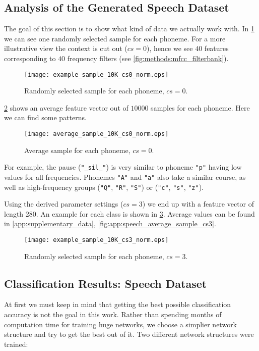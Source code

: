 \subsection*{Analysis of the Generated Speech Dataset}
The goal of this section is to show what kind of data we actually work with. In \cref{fig:examples:speech_example_sample_cs0} we can see one randomly selected sample for each phoneme. For a more illustrative view the context is cut out ($ cs = 0 $), hence we see $ 40 $ features corresponding to $ 40 $ frequency filters (see \cref{fig:methods:mfcc_filterbank}).

\begin{figure}[H]
\centering
\texttt{[image: example\_sample\_10K\_cs0\_norm.eps]}
\caption{Randomly selected sample for each phoneme, $ cs = 0 $.}
\label{fig:examples:speech_example_sample_cs0}
\end{figure}

\cref{fig:examples:speech_average_sample_cs0} shows an average feature vector out of $ 10000 $ samples for each phoneme. Here we can find some patterns.

\begin{figure}[H]
\centering
\texttt{[image: average\_sample\_10K\_cs0\_norm.eps]}
\caption{Average sample for each phoneme, $ cs = 0 $.}
\label{fig:examples:speech_average_sample_cs0}
\end{figure}

For example, the pause (\texttt{"\_sil\_"}) is very similar to phoneme \texttt{"p"} having low values for all frequencies. Phonemes \texttt{"A"} and \texttt{"a"} also take a similar course, as well as high-frequency groups (\texttt{"Q"}, \texttt{"R"}, \texttt{"S"}) or (\texttt{"c"}, \texttt{"s"}, \texttt{"z"}).

Using the derived parameter settings ($ cs = 3 $) we end up with a feature vector of length $ 280 $. An example for each class is shown in \cref{fig:examples:speech_example_sample_cs3}. Average values can be found in \cref{app:supplementary_data}, \cref{fig:app:speech_average_sample_cs3}.

\begin{figure}[H]
\centering
\texttt{[image: example\_sample\_10K\_cs3\_norm.eps]}
\caption{Randomly selected sample for each phoneme, $ cs = 3 $.}
\label{fig:examples:speech_example_sample_cs3}
\end{figure}

\subsection*{Classification Results: Speech Dataset}
At first we must keep in mind that getting the best possible classification accuracy is not the goal in this work. Rather than spending months of computation time for training huge networks, we choose a simplier network structure and try to get the best out of it. Two different network structures were trained:


